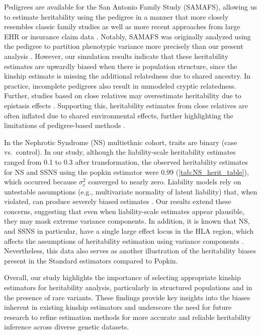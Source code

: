 \documentclass[11pt]{article}
\begin{document}
Pedigrees are available for the San Antonio Family Study (SAMAFS), allowing us to estimate heritability using the pedigree in a manner that more closely resembles classic family studies \citep{almasy1998multipoint} as well as more recent approaches from large EHR or insurance claim data \citep{polubriaginof2018disease,wang2017classification}. 
Notably, SAMAFS was originally analyzed using the pedigree to partition phenotypic variance more precisely than our present analysis \citep{mitchell1996genetic}. 
However, our simulation results indicate that these heritability estimates are upwardly biased when there is population structure, since the kinship estimate is missing the additional relatedness due to shared ancestry.
In practice, incomplete pedigrees also result in unmodeled cryptic relatedness.
Further, studies based on close relatives may overestimate heritability due to epistasis effects \citep{hemani2013evolutionary,young2014estimation}. 
Supporting this, heritability estimates from close relatives are often inflated due to shared environmental effects, further highlighting the limitations of pedigree-based methods \citep{zaitlen2013using}.

In the Nephrotic Syndrome (NS) multiethnic cohort, traits are binary (case vs.~control). In our study, although the liability-scale heritability estimates ranged from 0.1 to 0.3 after transformation, the observed heritability estimates for NS and SSNS using the popkin estimator were 0.99  (\cref{tab:NS_herit_table}), which occurred because ${\sigma}^2_e$ converged to nearly zero. 
Liability models rely on untestable assumptions (e.g., multivariate normality of latent liability) that, when violated, can produce severely biased estimates \citep{benchek2013meaningful}. 
Our results extend these concerns, suggesting that even when liability-scale estimates appear plausible, they may mask extreme variance components. 
In addition, it is known that NS, and SSNS in particular, have a single large effect locus in the HLA region, which affects the assumptions of heritability estimation using variance components \citep{gbadegesin2015hla,adeyemo2018hla,debiec2018transethnic,jia2018strong,dufek2019genetic,jia2020common,barry2023multi}.
Nevertheless, this data also serves as another illustration of the heritability biases present in the Standard estimators compared to Popkin.

Overall, our study highlights the importance of selecting appropriate kinship estimators for heritability analysis, particularly in structured populations and in the presence of rare variants. These findings provide key insights into the biases inherent in existing kinship estimators and underscore the need for future research to refine estimation methods for more accurate and reliable heritability inference across diverse genetic datasets.
\end{document}
